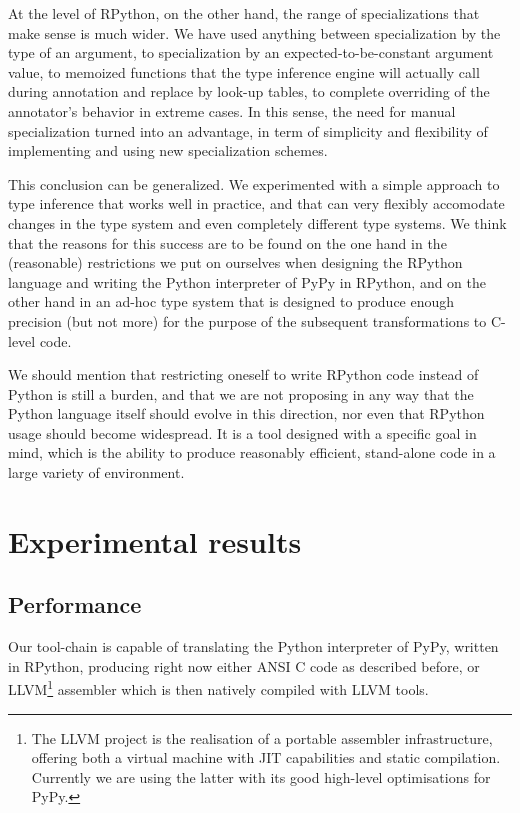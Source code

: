 \documentclass{acm_proc_article-sp}
\begin{document}
At the level of RPython, on the other hand, the range of specializations
that make sense is much wider.  We have used anything between
specialization by the type of an argument, to specialization by an
expected-to-be-constant argument value, to memoized functions that the
type inference engine will actually call during annotation and replace
by look-up tables, to complete overriding of the annotator's behavior in
extreme cases.  In this sense, the need for manual specialization turned
into an advantage, in term of simplicity and flexibility of implementing
and using new specialization schemes.

This conclusion can be generalized.  We experimented with a simple
approach to type inference that works well in practice, and that can
very flexibly accomodate changes in the type system and even completely
different type systems.  We think that the reasons for this success are
to be found on the one hand in the (reasonable) restrictions we put on
ourselves when designing the RPython language and writing the Python
interpreter of PyPy in RPython, and on the other hand in an ad-hoc type
system that is designed to produce enough precision (but not more) for
the purpose of the subsequent transformations to C-level code.

We should mention that restricting oneself to write RPython code instead
of Python is still a burden, and that we are not proposing in any way
that the Python language itself should evolve in this direction, nor
even that RPython usage should become widespread.  It is a tool designed
with a specific goal in mind, which is the ability to produce reasonably
efficient, stand-alone code in a large variety of environment.



\section{Experimental results}
\label{experimentalresults}


\subsection{Performance}

Our tool-chain is capable of translating the Python interpreter of
PyPy, written in RPython, producing right now either ANSI C code as
described before, or LLVM\footnote{The LLVM project is the realisation
of a portable assembler infrastructure, offering both a virtual
machine with JIT capabilities and static compilation. Currently we are
using the latter with its good high-level optimisations for PyPy.}
assembler which is then natively compiled with LLVM tools.
\end{document}
